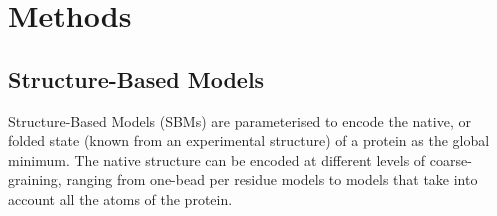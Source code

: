 \documentclass[journal=jacsat]{achemso}
\begin{document}
\section{Methods}
\subsection{Structure-Based Models}
Structure-Based Models (SBMs)\cite{smog,Neelamraju19a} are parameterised to encode the native, or folded state (known from an experimental structure) of a protein as the global minimum. The native structure can be encoded at different levels of coarse-graining, ranging from one-bead per residue models to models that take into account all the atoms of the protein\cite{Neelamraju19a}.

\end{document}
